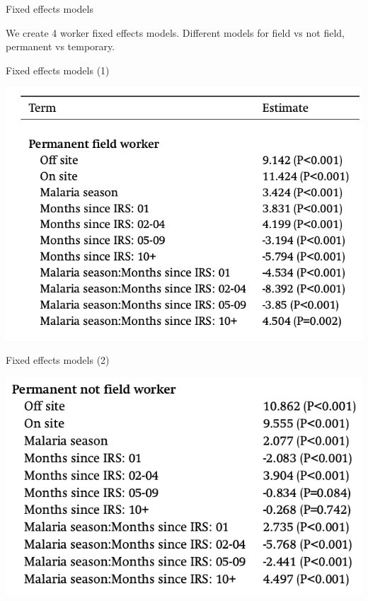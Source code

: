 \documentclass[ignorenonframetext,]{beamer}
\begin{document}
\begin{frame}{Fixed effects models}

We create 4 worker fixed effects models. Different models for field vs
not field, permanent vs temporary.

\end{frame}

\begin{frame}{Fixed effects models (1)}

\includegraphics{images/fe1.png}

\end{frame}

\begin{frame}{Fixed effects models (2)}

\includegraphics{images/fe2.png}

\end{frame}
\end{document}
